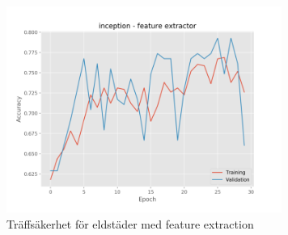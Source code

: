 \documentclass[]{kththesis}
\begin{document}
\begin{figure}[h]
    \includegraphics[width=9cm]{f_a_inception_fe}
    \caption{Träffsäkerhet för eldstäder med feature extraction}
    \label{fig:f_a_1}
  \end{figure}
\end{document}
